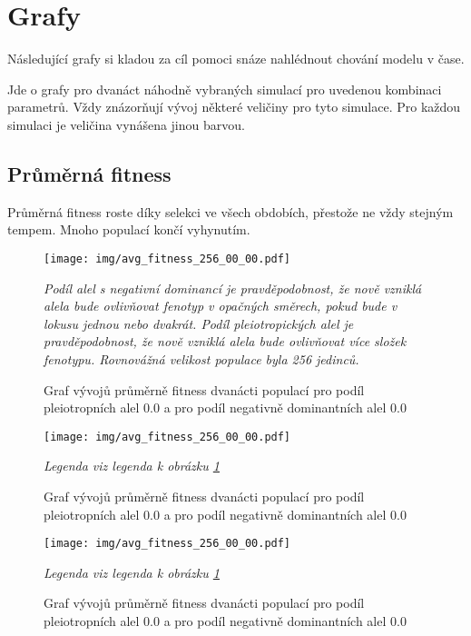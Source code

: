 \section{Grafy}
\label{sec:graphs}

Následující grafy si kladou za cíl pomoci snáze nahlédnout chování modelu v čase.

Jde o grafy pro dvanáct náhodně vybraných simulací pro uvedenou kombinaci parametrů.
Vždy znázorňují vývoj některé veličiny pro tyto simulace. Pro každou simulaci je veličina
vynášena jinou barvou.

\subsection{Průměrná fitness}

Průměrná fitness roste díky selekci ve všech obdobích, přestože ne vždy stejným tempem. Mnoho populací končí vyhynutím.

\begin{figure}[h]
\caption{Graf vývojů průměrně fitness dvanácti populací pro podíl pleiotropních alel 0.0 a pro podíl negativně
         dominantních alel 0.0}
\centering
\texttt{[image: img/avg\_fitness\_256\_00\_00.pdf]}

\label{fig:avg_fitness_256_0.0_0.0}

\textit{Podíl alel s negativní dominancí je pravděpodobnost, že nově vzniklá alela bude ovlivňovat fenotyp v opačných
        směrech, pokud bude v lokusu jednou nebo dvakrát. Podíl pleiotropických alel je pravděpodobnost, že nově vzniklá alela
        bude ovlivňovat více složek fenotypu. Rovnovážná velikost populace byla 256 jedinců.}

\end{figure}


\begin{figure}[h]
\caption{Graf vývojů průměrně fitness dvanácti populací pro podíl pleiotropních alel 0.0 a pro podíl negativně
         dominantních alel 0.0}
\centering
\texttt{[image: img/avg\_fitness\_256\_00\_00.pdf]}

\label{fig:avg_fitness_sssssss256_0.0_0.0}

\textit{Legenda viz legenda k obrázku \ref{fig:avg_fitness_256_0.0_0.0}}

\end{figure}

\begin{figure}[h]
\caption{Graf vývojů průměrně fitness dvanácti populací pro podíl pleiotropních alel 0.0 a pro podíl negativně
         dominantních alel 0.0}
\centering
\texttt{[image: img/avg\_fitness\_256\_00\_00.pdf]}

\label{fig:avg_fitness_2sss56_0.0_0.0}

\textit{Legenda viz legenda k obrázku \ref{fig:avg_fitness_256_0.0_0.0}}

\end{figure}